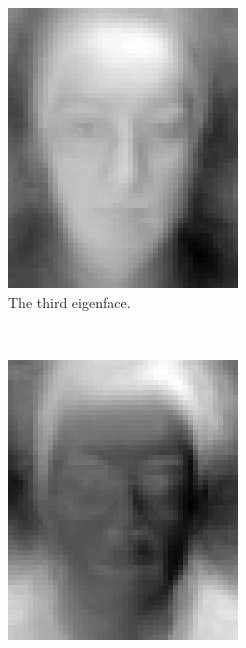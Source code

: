 \documentclass[a4paper, 10pt, conference]{ieeeconf}
\begin{document}
\begin{figure}[ht]
\begin{subfigure}{0.2\textwidth}
          \includegraphics[width=\textwidth]{src/eigface6.png}
          \caption{The third eigenface.}
                \label{fig:eigface6}
        \end{subfigure}
        ~
        \begin{subfigure}{0.2\textwidth}
          \includegraphics[width=\textwidth]{src/eigface7.png}

\end{subfigure}
\end{figure}
\end{document}

